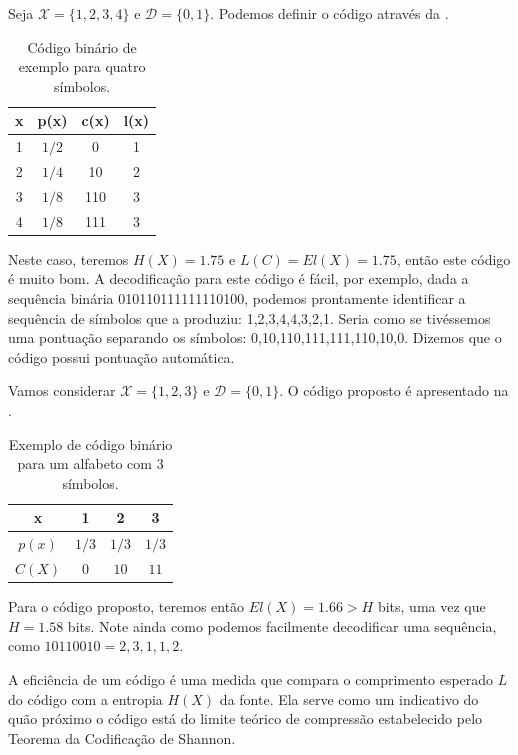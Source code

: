 \begin{example}
  Seja $\mathcal{X} = \{1, 2, 3, 4\}$ e $\mathcal{D} = \{0, 1\}$. Podemos definir
  o código através da .
  \begin{table}[h]
    \centering
    \caption{Código binário de exemplo para quatro símbolos.}\label{tb:excode1}
    \begin{tabular}{c|c|c|c}
      x & p(x)  & c(x) & l(x) \\ \hline
      1 & $1/2$ & 0    & 1    \\
      2 & $1/4$ & 10   & 2    \\
      3 & $1/8$ & 110  & 3    \\
      4 & $1/8$ & 111  & 3    \\
    \end{tabular}
  \end{table}
  Neste caso, teremos $H(X) = 1.75$ e $L(C)=El(X)=1.75$, então este código é muito bom.
  A decodificação para este código é fácil, por exemplo, dada a sequência binária 010110111111110100,
  podemos prontamente identificar a sequência de símbolos que a produziu: 1,2,3,4,4,3,2,1.
  Seria como se tivéssemos uma pontuação separando os símbolos: 0,10,110,111,111,110,10,0.
  Dizemos que o código possui pontuação automática.
\end{example}

\begin{example}
Vamos considerar $\mathcal{X} = \{1,2,3\}$ e $\mathcal{D}=\{0,1\}$.
O código proposto é apresentado na .
\begin{table}[h]
  \centering
  \caption{Exemplo de código binário para um alfabeto com 3 símbolos.}\label{tb:excode2}
   \begin{tabular}{c|ccc}
   x      &  1    &   2   &   3   \\ \hline
   $p(x)$ & $1/3$ & $1/3$ & $1/3$ \\ 
   $C(X)$ & $0$   & $10$  & $11$
   \end{tabular}
\end{table}
Para o código proposto, teremos então $El(X)=1.66 > H$ bits, uma vez que $H = 1.58$ bits.
Note ainda como podemos facilmente decodificar uma sequência, como $10110010 = 2,3,1,1,2$.
\end{example}

A eficiência de um código é uma medida que compara o comprimento esperado $L$
do código com a entropia $H(X)$ da fonte. Ela serve como um indicativo do
quão próximo o código está do limite teórico de
compressão estabelecido pelo Teorema da Codificação de Shannon.

